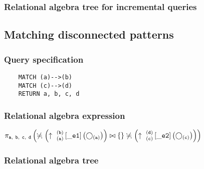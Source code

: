 	\subsubsection*{Relational algebra tree for incremental queries}

	\subsection{Matching disconnected patterns}

	\subsubsection*{Query specification}

	\begin{lstlisting}
	MATCH (a)-->(b)
	MATCH (c)-->(d)
	RETURN a, b, c, d
	\end{lstlisting}


	\subsubsection*{Relational algebra expression}

	$\projection{\var{a},~\var{b},~\var{c},~\var{d}} \left(\alldifferent{} \left(\expandout{a}{b}{}{\_e1}{} \left(\getvertices{a}{}\right)\right) \join \{\} \alldifferent{} \left(\expandout{c}{d}{}{\_e2}{} \left(\getvertices{c}{}\right)\right)\right)$

	\subsubsection*{Relational algebra tree}


